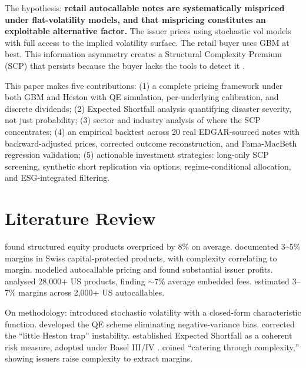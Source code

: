 \documentclass[10pt,a4paper]{article}
\begin{document}
The hypothesis: \textbf{retail autocallable notes are systematically mispriced under flat-volatility models, and that mispricing constitutes an exploitable alternative factor.} The issuer prices using stochastic vol models with full access to the implied volatility surface. The retail buyer uses GBM at best. This information asymmetry creates a Structural Complexity Premium (SCP) that persists because the buyer lacks the tools to detect it \citep{celerier2017}.

This paper makes five contributions: (1) a complete pricing framework under both GBM and Heston with QE simulation, per-underlying calibration, and discrete dividends; (2) Expected Shortfall analysis quantifying disaster severity, not just probability; (3) sector and industry analysis of where the SCP concentrates; (4) an empirical backtest across 20 real EDGAR-sourced notes with backward-adjusted prices, corrected outcome reconstruction, and Fama-MacBeth regression validation; (5) actionable investment strategies: long-only SCP screening, synthetic short replication via options, regime-conditional allocation, and ESG-integrated filtering.

\newpage\section{Literature Review}\label{sec:lit}
\citet{henderson2011} found structured equity products overpriced by 8\% on average. \citet{wallmeier2009} documented 3--5\% margins in Swiss capital-protected products, with complexity correlating to margin. \citet{deng2011} modelled autocallable pricing and found substantial issuer profits. \citet{vokata2021} analysed 28,000+ US products, finding $\sim$7\% average embedded fees. \citet{celiere2023} estimated 3--7\% margins across 2,000+ US autocallables.

On methodology: \citet{heston1993} introduced stochastic volatility with a closed-form characteristic function. \citet{andersen2008} developed the QE scheme eliminating negative-variance bias. \citet{albrecher2007} corrected the ``little Heston trap'' instability. \citet{acerbi2002} established Expected Shortfall as a coherent risk measure, adopted under Basel III/IV \citep{bcbs2019}. \citet{celerier2017} coined ``catering through complexity,'' showing issuers raise complexity to extract margins.
\end{document}
